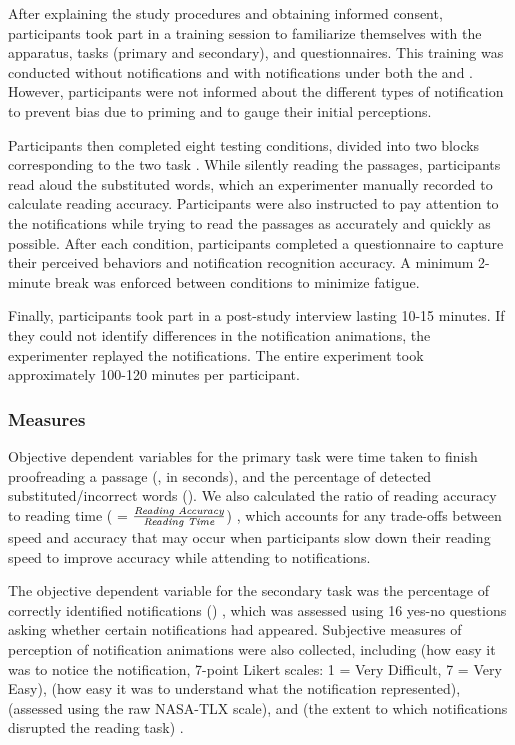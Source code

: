 After explaining the study procedures and obtaining informed consent, participants took part in a training session to familiarize themselves with the apparatus, tasks (primary and secondary), and questionnaires. This training was conducted without notifications and with \instant{} notifications under both the \desktop{} and \glass{} . However, participants were not informed about the different types of notification  to prevent bias due to priming and to gauge their initial perceptions.

Participants then completed eight testing conditions, divided into two blocks corresponding to the two task . While silently reading the passages, participants read aloud the substituted words, which an experimenter manually recorded to calculate reading accuracy. Participants were also instructed to pay attention to the notifications while trying to read the passages as accurately and quickly as possible. After each condition, participants completed a questionnaire to capture their perceived behaviors and notification recognition accuracy. A minimum 2-minute break was enforced between conditions to minimize fatigue.

Finally, participants took part in a post-study interview lasting 10-15 minutes. If they could not identify differences in the notification animations, the experimenter replayed the notifications. The entire experiment took approximately 100-120 minutes per participant.


\subsubsection*{Measures}
\label{sec:GradNotif:study1:measures}

Objective dependent variables for the primary task were time taken to finish proofreading a passage (\readingTime{}, in seconds), and the percentage of detected substituted/incorrect words (\readingAccuracy{}). We also calculated the ratio of reading accuracy to reading time (\adjustedReadingAccuracy{} = $\frac{\textit{Reading Accuracy}{}}{\textit{Reading Time}{}}$) \cite{bernard_comparing_2003, jankowski_integrating_2010}, which accounts for any trade-offs between speed and accuracy that may occur when participants slow down their reading speed to improve accuracy while attending to notifications.

The objective dependent variable for the secondary task was the percentage of correctly identified notifications (\notificationAccuracy{}) \cite{mccrickard_establishing_2003}, which was assessed using 16 yes-no questions asking whether certain notifications had appeared. Subjective measures of perception of notification animations were also collected, including \noticeability{} (how easy it was to notice the notification, 7-point Likert scales: 1 = Very Difficult, 7 = Very Easy), \understandability{} (how easy it was to understand what the notification represented), \perceivedTaskLoad{} (assessed using the raw NASA-TLX scale), and \perceivedInterruption{} (the extent to which notifications disrupted the reading task) \cite{rzayev_effects_2020, nasa_tlx_2006}.

